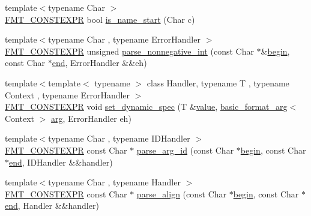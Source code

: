 \begin{DoxyCompactItemize}
\item 
{\footnotesize template$<$typename Char $>$ }\\\hyperlink{core_8h_a69201cb276383873487bf68b4ef8b4cd}{F\+M\+T\+\_\+\+C\+O\+N\+S\+T\+E\+X\+PR} bool \hyperlink{namespaceinternal_ad6d8c955cfd596d1b78f1cc87d2cc489}{is\+\_\+name\+\_\+start} (Char c)
\item 
{\footnotesize template$<$typename Char , typename Error\+Handler $>$ }\\\hyperlink{core_8h_a69201cb276383873487bf68b4ef8b4cd}{F\+M\+T\+\_\+\+C\+O\+N\+S\+T\+E\+X\+PR} unsigned \hyperlink{namespaceinternal_af621000934cb16d73595619aebb0a35a}{parse\+\_\+nonnegative\+\_\+int} (const Char $\ast$\&\hyperlink{namespaceinternal_a265f36d9dee68d3f44381347ef2fd5cb}{begin}, const Char $\ast$\hyperlink{namespaceinternal_a94820de1710dc8038fa6f188adfe299b}{end}, Error\+Handler \&\&eh)
\item 
{\footnotesize template$<$template$<$ typename $>$ class Handler, typename T , typename Context , typename Error\+Handler $>$ }\\\hyperlink{core_8h_a69201cb276383873487bf68b4ef8b4cd}{F\+M\+T\+\_\+\+C\+O\+N\+S\+T\+E\+X\+PR} void \hyperlink{namespaceinternal_aa85eeb6162dd6a5dcc6b8416d9bba83c}{set\+\_\+dynamic\+\_\+spec} (T \&\hyperlink{classinternal_1_1value}{value}, \hyperlink{classbasic__format__arg}{basic\+\_\+format\+\_\+arg}$<$ Context $>$ \hyperlink{core_8h_ab87859023d64d26171b1e74a3d0c3b99}{arg}, Error\+Handler eh)
\item 
{\footnotesize template$<$typename Char , typename I\+D\+Handler $>$ }\\\hyperlink{core_8h_a69201cb276383873487bf68b4ef8b4cd}{F\+M\+T\+\_\+\+C\+O\+N\+S\+T\+E\+X\+PR} const Char $\ast$ \hyperlink{namespaceinternal_a0f424657f3b1900377b8597f5516432e}{parse\+\_\+arg\+\_\+id} (const Char $\ast$\hyperlink{namespaceinternal_a265f36d9dee68d3f44381347ef2fd5cb}{begin}, const Char $\ast$\hyperlink{namespaceinternal_a94820de1710dc8038fa6f188adfe299b}{end}, I\+D\+Handler \&\&handler)
\item 
{\footnotesize template$<$typename Char , typename Handler $>$ }\\\hyperlink{core_8h_a69201cb276383873487bf68b4ef8b4cd}{F\+M\+T\+\_\+\+C\+O\+N\+S\+T\+E\+X\+PR} const Char $\ast$ \hyperlink{namespaceinternal_a07a6cecb40169f9f2eb091d0e83cc52f}{parse\+\_\+align} (const Char $\ast$\hyperlink{namespaceinternal_a265f36d9dee68d3f44381347ef2fd5cb}{begin}, const Char $\ast$\hyperlink{namespaceinternal_a94820de1710dc8038fa6f188adfe299b}{end}, Handler \&\&handler)

\end{DoxyCompactItemize}
